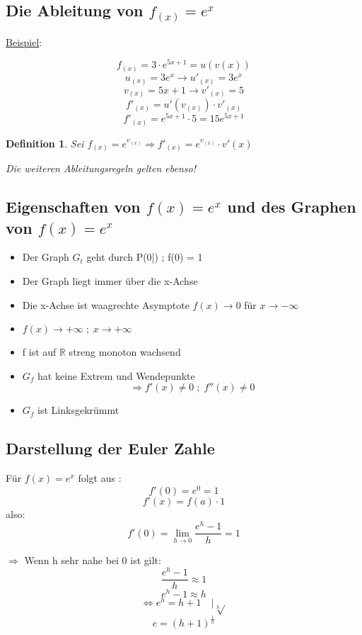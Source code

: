 \documentclass{scrbook}
\newtheorem{definition}{Definition}
\begin{document}
\subsection{Die Ableitung von $f_{(x)} = e^x$}
\underline{Beispiel}:

\[f_{(x)} = 3 \cdot e ^{5x + 1} = u(v(x)) \]
\[u_{(x)} = 3e^x \rightarrow u'_{(x)} = 3e^x\]
\[v_{(x)} = 5x+1 \rightarrow v'_{(x)} = 5\]
\[f'_{(x)} = u'(v_{(x)})\cdot v'_{(x)}\]
\[f'_{(x)}= e^{5x+1} \cdot 5 = 15 e^{5x+1}\]

\begin{definition}
Sei $f_{(x)} = e^{v_{(x)}} \Rightarrow f'_{(x)} = e^{v_{(x)} }\cdot v'(x)$

Die weiteren Ableitungsregeln gelten ebenso!
\end{definition}

\subsection{Eigenschaften von $f(x) = e^x $ und des Graphen von $f(x) = e^x$}
\begin {itemize}
\item Der Graph $G_t$ geht durch P(0|) ; f(0) = 1
\item Der Graph liegt immer über die x-Achse
\item Die x-Achse ist waagrechte Asymptote $f(x) \rightarrow 0$ für $x \rightarrow -\infty$
\item $f(x) \rightarrow + \infty \; ; \; x \rightarrow + \infty$
\item f ist auf $\mathbb{R}$ streng monoton wachsend
\item $G_f$ hat keine Extrem und Wendepunkte 
\[ \Rightarrow f'(x) \not = 0 \; ; \; f'' (x) \not = 0\]
\item $G_f$ ist Linksgekrümmt
\end{itemize}



\subsection{Darstellung der Euler Zahle}

Für $f(x) = e^x$ folgt aus : 
\[f'(0) = e^0 = 1\]
\[f'(x) = f(a) \cdot 1 \]
also:
\[f'(0) = \lim_{h\rightarrow0}\frac {e^h -1}h = 1\]

$\Rightarrow$ Wenn h sehr nahe bei 0 ist gilt:
\[\frac{e^h - 1}h \approx 1 \]
\[e^h-1 \approx h\]
\[ \Leftrightarrow e^h = h+1 \quad | \sqrt[h]{}\]
\[ e = (h+1)^{\frac1h}\]
\end{document}
